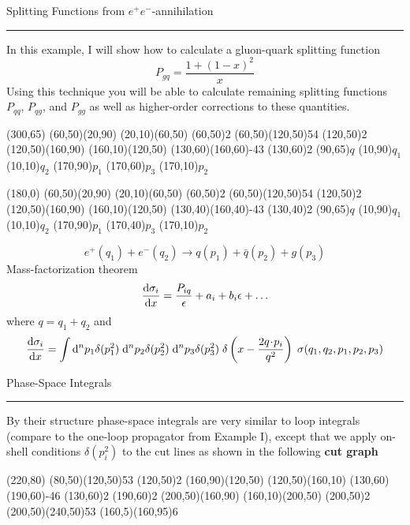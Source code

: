 \documentclass[11pt]{article}
\newcommand{\titleb}[2]{{\color{Blue}{\LARGE #1}\hfill{\Large #2}\vspace{-2mm}\par\rule{\textwidth}{1pt}\vs}}
\begin{document}
\titleb{Example 2}{Splitting Functions from $e^+ e^-$-annihilation}
In this example, I will show how to calculate a gluon-quark splitting function
$$P_{gq} = \frac{1 + (1-x)^2}{x}$$%
Using this technique you will be able to calculate remaining splitting functions $P_{qq}$, $P_{qg}$, and $P_{gg}$ as well as higher-order corrections to these quantities.
\begin{center}
\begin{axopicture}(300,65)
  \Line[arrow](60,50)(20,90)
  \Line[arrow](20,10)(60,50)
  \Vertex(60,50){2}
  \Photon(60,50)(120,50){5}{4}
  \Vertex(120,50){2}
  \Line[arrow](120,50)(160,90)
  \Line[arrow](160,10)(120,50)
  \Gluon(130,60)(160,60){-4}{3}
  \Vertex(130,60){2}
  \Text(90,65){$q$}
  \Text(10,90){$q_1$}
  \Text(10,10){$q_2$}
  \Text(170,90){$p_1$}
  \Text(170,60){$p_3$}
  \Text(170,10){$p_2$}

  \SetOffset(180,0)
  \Line[arrow](60,50)(20,90)
  \Line[arrow](20,10)(60,50)
  \Vertex(60,50){2}
  \Photon(60,50)(120,50){5}{4}
  \Vertex(120,50){2}
  \Line[arrow](120,50)(160,90)
  \Line[arrow](160,10)(120,50)
  \Gluon(130,40)(160,40){-4}{3}
  \Vertex(130,40){2}
  \Text(90,65){$q$}
  \Text(10,90){$q_1$}
  \Text(10,10){$q_2$}
  \Text(170,90){$p_1$}
  \Text(170,40){$p_3$}
  \Text(170,10){$p_2$}
\end{axopicture}
\end{center}
$$e^+(q_1) + e^-(q_2) \to q(p_1) + \bar{q}(p_2) + g(p_3)$$%
Mass-factorization theorem 
$$
 \frac{\mathrm{d}\sigma_i}{\mathrm{d} x} = \frac{P_{iq}}{\epsilon} + a_i + b_i \epsilon + \ldots
$$%
where $q=q_1+q_2$ and
$$
\frac{\mathrm{d}\sigma_i}{\mathrm{d} x} = \int \mathrm{d}^n p_1 \delta(p_1^2) \; \mathrm{d}^n p_2 \delta(p_2^2) \; \mathrm{d}^n p_3 \delta(p_3^2) \; \delta\left(x-\frac{2 q\!\cdot\!p_i}{q^2}\right) \; \sigma(q_1,q_2,p_1,p_2,p_3)
$$
\newpage


\titleb{Example 2}{Phase-Space Integrals}
By their structure phase-space integrals are very similar to loop integrals (compare to the one-loop propagator from Example I), except that we apply on-shell conditions $\delta(p_i^2)$ to the cut lines as shown in the following {\bf cut graph}

\begin{center}
\begin{axopicture}(220,80)
  \Photon(80,50)(120,50){5}{3}
  \Vertex(120,50){2}
  \Line[arrow](160,90)(120,50)
  \Line[arrow](120,50)(160,10)
  \Gluon(130,60)(190,60){-4}{6}
  \Vertex(130,60){2}
  \Vertex(190,60){2}
  \Line[arrow](200,50)(160,90)
  \Line[arrow](160,10)(200,50)
  \Vertex(200,50){2}
  \Photon(200,50)(240,50){5}{3}
  \DashLine(160,5)(160,95){6}
\end{axopicture}
\end{center}
\end{document}
